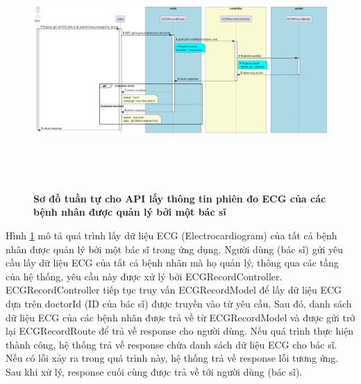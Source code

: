 \begin{enumerate}[a)]
\begin{figure}[H]
  \centering
  \includegraphics[width=16cm,height=9cm]{Images/server/sequence/server/getEcgRecordsByDoctor.png}
  \caption[Sơ đồ tuần tự cho API lấy thông tin phiên đo ECG của các bệnh nhân được quản lý bởi một bác sĩ ]{\bfseries \fontsize{12pt}{0pt}
  \selectfont Sơ đồ tuần tự cho API lấy thông tin phiên đo ECG của các bệnh nhân được quản lý bởi một bác sĩ }
  \label{getEcgRecordsByDoctor} %
\end{figure}
Hình \ref{getEcgRecordsByDoctor} mô tả quá trình lấy dữ liệu ECG (Electrocardiogram) của tất cả bệnh nhân được quản lý bởi một bác sĩ trong ứng dụng. Người dùng (bác sĩ) gửi yêu cầu lấy dữ liệu ECG của tất cả bệnh nhân mà họ quản lý, thông qua các tầng của hệ thống, yêu cầu này được xử lý bởi ECGRecordController. ECGRecordController tiếp tục truy vấn ECGRecordModel để lấy dữ liệu ECG dựa trên doctorId (ID của bác sĩ) được truyền vào từ yêu cầu. Sau đó, danh sách dữ liệu ECG của các bệnh nhân được trả về từ ECGRecordModel và được gửi trở lại ECGRecordRoute để trả về response cho người dùng. Nếu quá trình thực hiện thành công, hệ thống trả về response chứa danh sách dữ liệu ECG cho bác sĩ. Nếu có lỗi xảy ra trong quá trình này, hệ thống trả về response lỗi tương ứng. Sau khi xử lý, response cuối cùng được trả về tới người dùng (bác sĩ).



\end{enumerate}
